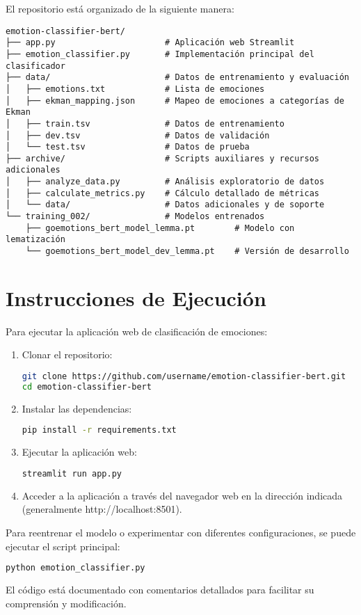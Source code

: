 \documentclass[12pt,a4paper]{report}
\begin{document}
El repositorio está organizado de la siguiente manera:

\begin{lstlisting}
emotion-classifier-bert/
├── app.py                      # Aplicación web Streamlit
├── emotion_classifier.py       # Implementación principal del clasificador
├── data/                       # Datos de entrenamiento y evaluación
│   ├── emotions.txt            # Lista de emociones
│   ├── ekman_mapping.json      # Mapeo de emociones a categorías de Ekman
│   ├── train.tsv               # Datos de entrenamiento
│   ├── dev.tsv                 # Datos de validación
│   └── test.tsv                # Datos de prueba
├── archive/                    # Scripts auxiliares y recursos adicionales
│   ├── analyze_data.py         # Análisis exploratorio de datos
│   ├── calculate_metrics.py    # Cálculo detallado de métricas
│   └── data/                   # Datos adicionales y de soporte
└── training_002/               # Modelos entrenados
    ├── goemotions_bert_model_lemma.pt        # Modelo con lematización
    └── goemotions_bert_model_dev_lemma.pt    # Versión de desarrollo
\end{lstlisting}

\section{Instrucciones de Ejecución}

Para ejecutar la aplicación web de clasificación de emociones:

\begin{enumerate}
  \item Clonar el repositorio:
  \begin{lstlisting}[language=bash]
git clone https://github.com/username/emotion-classifier-bert.git
cd emotion-classifier-bert
  \end{lstlisting}

  \item Instalar las dependencias:
  \begin{lstlisting}[language=bash]
pip install -r requirements.txt
  \end{lstlisting}

  \item Ejecutar la aplicación web:
  \begin{lstlisting}[language=bash]
streamlit run app.py
  \end{lstlisting}

  \item Acceder a la aplicación a través del navegador web en la dirección indicada (generalmente http://localhost:8501).
\end{enumerate}

Para reentrenar el modelo o experimentar con diferentes configuraciones, se puede ejecutar el script principal:

\begin{lstlisting}[language=bash]
python emotion_classifier.py
\end{lstlisting}

El código está documentado con comentarios detallados para facilitar su comprensión y modificación.
\end{document}
